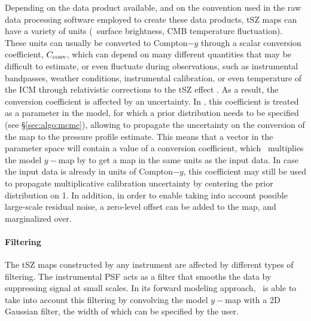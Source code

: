 Depending on the data product available, and on the convention used in the raw data processing software employed to create these data products, tSZ maps can have a variety of units (\eg\ surface brightness, CMB temperature fluctuation).
These units can usually be converted to Compton$-y$ through a scalar conversion coefficient, $C_{\rm conv}$, which can depend on many different quantities that may be difficult to estimate, or even fluctuate during observations, such as instrumental bandpasses, weather conditions, instrumental calibration, or even temperature of the ICM through relativistic corrections to the tSZ effect \citep{mroczkowski_astrophysics_2019}.
As a result, the conversion coefficient is affected by an uncertainty.
In \panco, this coefficient is treated as a parameter in the model, for which a prior distribution needs to be specified (see \S\ref{sec:algo:mcmc}), allowing to propagate the uncertainty on the conversion of the map to the pressure profile estimate.
This means that a vector in the parameter space will contain a value of a conversion coefficient, which \panco\ multiplies the model $y-$map by to get a map in the same units as the input data.
In case the input data is already in units of Compton$-y$, this coefficient may still be used to propagate multiplicative calibration uncertainty by centering the prior distribution on 1.
In addition, in order to enable taking into account possible large-scale residual noise, a zero-level offset can be added to the map, and marginalized over.

\paragraph{Filtering}

The tSZ maps constructed by any instrument are affected by different types of filtering.
The instrumental PSF acts as a filter that smooths the data by suppressing signal at small scales.
In its forward modeling approach, \panco\ is able to take into account this filtering by convolving the model $y-$map with a 2D Gaussian filter, the width of which can be specified by the user.

